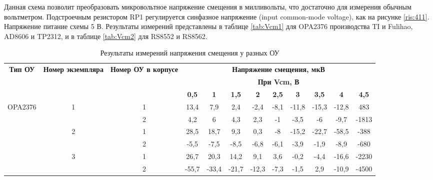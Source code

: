 Данная схема позволит преобразовать микровольтное напряжение смещения в милливольты, что достаточно для 
измерения обычным вольтметром. Подстроечным резистором RP1 регулируется синфазное напряжение
(input common-mode voltage), как 
на рисунке \ref{ris:411}. Напряжение питание схемы 5 В. Результаты измерений представлены в таблице
\ref{tab:Vcm1} для OPA2376 производства TI и Fulihao, AD8606 и TP2312, и в таблице \ref{tab:Vcm2} 
для RS8552 и RS8562.

\begin{table}[H]
    \begin{adjustwidth}{-1em}{}
    \centering
    \caption{Результаты измерений напряжения смещения у разных ОУ}
      \begin{tabular}{|c|c|c|c|c|c|c|c|c|c|c|c|}
      \hline
      \multicolumn{1}{|c|}{\multirow{3}[6]{2cm}{\textbf{Тип ОУ}}} & \multicolumn{1}{c|}{\multirow{3}[6]{1.4cm}{\textbf{Номер экземпляра}}} & \multicolumn{1}{c|}{\multirow{3}[6]{1.8cm}{\textbf{Номер ОУ в корпусе}}} & \multicolumn{9}{|c|}{\textbf{Напряжение смещения, мкВ}} \bigstrut\\
  \cline{4-12}          &       &       & \multicolumn{9}{|c|}{\textbf{При Vcm, В}} \bigstrut\\
  \cline{4-12}          &       &       & \textbf{0,5} & \textbf{1} & \textbf{1,5} & \textbf{2} & \textbf{2,5} & \textbf{3} & \textbf{3,5} & \textbf{4} & \textbf{4,5} \bigstrut\\
      \hline
      \multicolumn{1}{|c|}{\multirow{10}[20]{*}{OPA2376 }} & \multirow{2}[4]{*}{1} & 1     & 13,4  & 7,9   & 2,4   & -2,4  & -8,1  & -11,8 & -15,3 & -12,8 & 483 \bigstrut\\
  \cline{3-12}          &       & 2     & 4,2   & 6     & 4,3   & 2,3   & -1    & -3,5  & -6    & -9,7  & -1813 \bigstrut\\
  \cline{2-12}          & \multirow{2}[4]{*}{2} & 1     & 28,5  & 18,7  & 9,3   & 0,3   & -8    & -15,2 & -22,7 & -58,5 & -388 \bigstrut\\
  \cline{3-12}          &       & 2     & -5,5  & -7,5  & -8,5  & -6,8  & -6,1  & -3,9  & -1,9  & -8,9  & -680 \bigstrut\\
  \cline{2-12}          & \multirow{2}[4]{*}{3} & 1     & 26,7  & 20,3  & 14,2  & 9,1   & 3,6   & -0,2  & -4,4  & -16,6 & -2230 \bigstrut\\
  \cline{3-12}          &       & 2     & -55,7 & -33,4 & -21,7 & -12,3 & -7,3  & -1,5  & 2,9   & -10,9 & -4500 \bigstrut\\

\end{tabular}
\end{adjustwidth}
\end{table}

